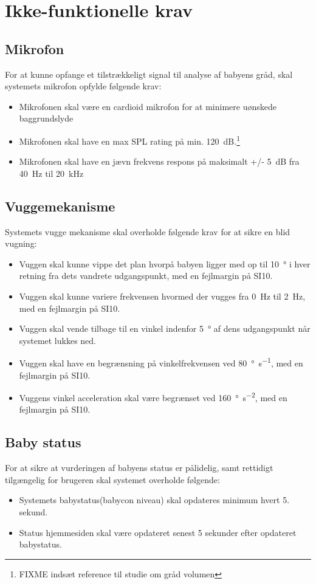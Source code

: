\section{Ikke-funktionelle krav}

\subsection*{Mikrofon}
For at kunne opfange et tilstrækkeligt signal til analyse af babyens gråd, skal systemets mikrofon opfylde følgende krav:
\begin{itemize}
\item Mikrofonen skal være en cardioid mikrofon for at minimere uønskede baggrundslyde
\item Mikrofonen skal have en max SPL rating på min. \SI{120}{\dB}.\footnote{FIXME indsæt reference til studie om gråd volumen}
\item Mikrofonen skal have en jævn frekvens respons på maksimalt +/- \SI{5}{\dB} fra \SI{40}{\hertz} til \SI{20}{\kilo\hertz}
\end{itemize}

\subsection*{Vuggemekanisme}

Systemets vugge mekanisme skal overholde følgende krav for at sikre en blid vugning:
\begin{itemize}
\item Vuggen skal kunne vippe det plan hvorpå babyen ligger med op til \SI{10}{\degree} i hver retning fra dets vandrete udgangspunkt, med en fejlmargin på SI{10}{\percent}.
\item Vuggen skal kunne variere frekvensen hvormed der vugges fra \SI{0}{\hertz} til \SI{2}{\hertz}, med en fejlmargin på SI{10}{\percent}.
\item Vuggen skal vende tilbage til en vinkel indenfor \SI{5}{\degree} af dens udgangspunkt når systemet lukkes ned.
\item Vuggen skal have en begrænsning på vinkelfrekvensen ved \SI{80}{\degree\per\second}, med en fejlmargin på SI{10}{\percent}.
\item Vuggens vinkel acceleration skal være begrænset ved \SI{160}{\degree\per\square\second}, med en fejlmargin på SI{10}{\percent}.
\end{itemize}

\subsection*{Baby status}
For at sikre at vurderingen af babyens status er pålidelig, samt rettidigt tilgængelig for brugeren skal systemet overholde følgende:
\begin{itemize}
\item Systemets babystatus(babycon niveau) skal opdateres minimum hvert 5. sekund.
\item Status hjemmesiden skal være opdateret senest 5 sekunder efter opdateret babystatus.
\end{itemize}

